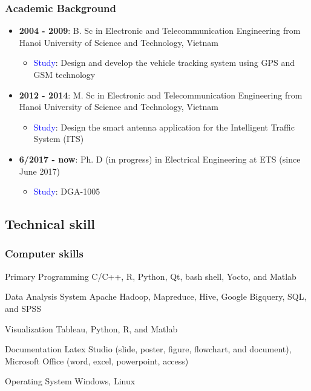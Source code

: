 \documentclass{beamer}
\begin{document}

\begin{frame}
\frametitle{Academic Background}
\begin{itemize}
	\item \textbf{2004 - 2009}: B. Sc in Electronic and Telecommunication Engineering from Hanoi University of Science and Technology, Vietnam 
	\begin{itemize}
		\item \textcolor{blue}{Study}: Design and develop the vehicle tracking system using GPS and GSM technology 
	\end{itemize}
	\item \textbf{2012 - 2014}: M. Sc in Electronic and Telecommunication Engineering from Hanoi University of Science and Technology, Vietnam 
	\begin{itemize}
		\item \textcolor{blue}{Study}: Design the smart antenna application for the Intelligent Traffic System (ITS)
	\end{itemize}
\item\textbf{ 6/2017 - now}: Ph. D (in progress) in Electrical Engineering at ETS (since June 2017) 
\begin{itemize}
	\item \textcolor{blue}{Study}: DGA-1005
\end{itemize}
	
	
\end{itemize}
\end{frame}

\subsection{Technical skill}

\begin{frame}
\frametitle{Computer skills}
\begin{block}{Primary Programming}
C/C++, R, Python, Qt, bash shell, Yocto, and Matlab
\end{block}

\begin{block}{Data Analysis System}
Apache Hadoop, Mapreduce, Hive, Google Bigquery, SQL, and SPSS
\end{block}

\begin{block}{Visualization}
Tableau, Python, R, and Matlab
\end{block}

\begin{block}{Documentation}
	Latex Studio (slide, poster, figure, flowchart, and document), Microsoft Office (word, excel, powerpoint, access)
\end{block}

\begin{block}{Operating System}
Windows, Linux
\end{block}



\end{frame}
\end{document}
